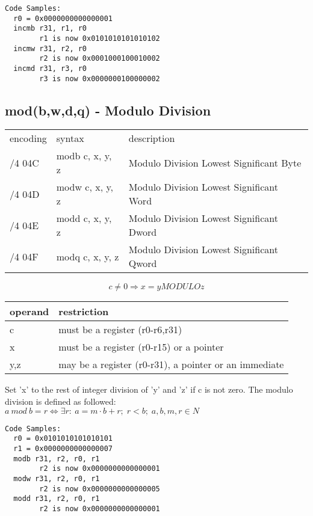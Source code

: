 \documentclass[letterpaper,10pt,openright,twoside,onecolumn]{book}
\begin{document}
  \begin{verbatim}
Code Samples:
  r0 = 0x0000000000000001
  incmb r31, r1, r0
        r1 is now 0x0101010101010102
  incmw r31, r2, r0
        r2 is now 0x0001000100010002
  incmd r31, r3, r0
        r3 is now 0x0000000100000002
  \end{verbatim}
\newpage\subsection{mod(b,w,d,q) - Modulo Division}
  \begin{tabular}{|l|l|l|}
   \hline
    encoding & syntax & description \\
    /4 04C & modb c, x, y, z & Modulo Division Lowest Significant Byte \\
    /4 04D & modw c, x, y, z & Modulo Division Lowest Significant Word \\
    /4 04E & modd c, x, y, z & Modulo Division Lowest Significant Dword \\
    /4 04F & modq c, x, y, z & Modulo Division Lowest Significant Qword \\
   \hline
   \hline
  \end{tabular}

  \begin{displaymath} c \neq 0 \Rightarrow x = y MODULO z\end{displaymath}

  \flushleft
  \begin{tabular}{|l|l|}
   \hline
    operand & restriction \\
   \hline
    c & must be a register (r0-r6,r31) \\
    x & must be a register (r0-r15) or a pointer \\
    y,z & may be a register (r0-r31), a pointer or an immediate \\
   \hline
  \end{tabular}

  Set 'x' to the rest of integer division of 'y' and 'z' if c is not zero.
  The modulo division is defined as followed:\\
  $a\: mod\: b=r \Leftrightarrow \exists r:\: a=m\cdot b+r;\; r<b;\; a, b, m, r \in N$
  \begin{verbatim}
Code Samples:
  r0 = 0x0101010101010101
  r1 = 0x0000000000000007
  modb r31, r2, r0, r1
        r2 is now 0x0000000000000001
  modw r31, r2, r0, r1
        r2 is now 0x0000000000000005
  modd r31, r2, r0, r1
        r2 is now 0x0000000000000001
  \end{verbatim}
\end{document}
